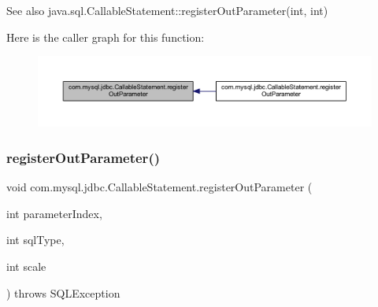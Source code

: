 \begin{DoxySeeAlso}{See also}
java.\+sql.\+Callable\+Statement\+::register\+Out\+Parameter(int, int) 
\end{DoxySeeAlso}
Here is the caller graph for this function\+:\nopagebreak
\begin{figure}[H]
\begin{center}
\leavevmode
\includegraphics[width=350pt]{classcom_1_1mysql_1_1jdbc_1_1_callable_statement_a5158af0506cf90040062b2049550f59b_icgraph}
\end{center}
\end{figure}
\mbox{\label{classcom_1_1mysql_1_1jdbc_1_1_callable_statement_aee8ffa31c60e761946b76031493a3682}} 
\subsubsection{\texorpdfstring{register\+Out\+Parameter()}{registerOutParameter()}\hspace{0.1cm}{\footnotesize\ttfamily [2/6]}}
{\footnotesize\ttfamily void com.\+mysql.\+jdbc.\+Callable\+Statement.\+register\+Out\+Parameter (\begin{DoxyParamCaption}\item[{int}]{parameter\+Index,  }\item[{int}]{sql\+Type,  }\item[{int}]{scale }\end{DoxyParamCaption}) throws S\+Q\+L\+Exception}

